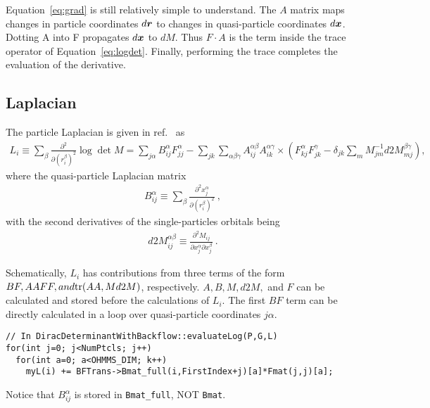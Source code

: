 Equation~\ref{eq:grad} is still relatively simple to understand. The $A$ matrix maps changes in particle coordinates $d\boldsymbol{r}$ to changes in quasi-particle coordinates $d\boldsymbol{x}$. Dotting A into F propagates $d\boldsymbol{x}$ to $dM$. Thus $F\cdot A$ is the term inside the trace operator of Equation~\ref{eq:logdet}. Finally, performing the trace completes the evaluation of the derivative.

\subsection{Laplacian}
The particle Laplacian is given in ref.~\cite{Kwon1993backflow} as
\begin{align}
L_i \equiv \sum\limits_{\beta} \frac{\partial^2}{\partial (r_i^\beta)^2} \log\det M = \sum\limits_{j\alpha} B_{ij}^\alpha F_{jj}^\alpha - \sum\limits_{jk}\sum\limits_{\alpha\beta\gamma} A_{ij}^{\alpha\beta}A_{ik}^{\alpha\gamma}\times\left(F_{kj}^\alpha F_{jk}^\gamma -\delta_{jk}\sum\limits_m M^{-1}_{jm} d2M_{mj}^{\beta\gamma}\right), \label{eq:lap}
\end{align}
where the quasi-particle Laplacian matrix
\begin{align}
B_{ij}^{\alpha} \equiv \sum\limits_\beta \frac{\partial^2 x_j^\alpha}{\partial (r_i^\beta)^2}\:,
\end{align}
with the second derivatives of the single-particles orbitals being
\begin{align}
d2M_{ij}^{\alpha\beta} \equiv \frac{\partial^2 M_{ij}}{\partial x_j^\alpha\partial x_j^\beta}\:.
\end{align}

Schematically, $L_i$ has contributions from three terms of the form $BF, AAFF, and \text{tr}(AA,Md2M)$, respectively. $A, B, M ,d2M,$ and $F$ can be calculated and stored before the calculations of $L_i$. The first $BF$ term can be directly calculated in a loop over quasi-particle coordinates $j\alpha$.
\begin{lstlisting}
// In DiracDeterminantWithBackflow::evaluateLog(P,G,L)
for(int j=0; j<NumPtcls; j++)
  for(int a=0; a<OHMMS_DIM; k++)
    myL(i) += BFTrans->Bmat_full(i,FirstIndex+j)[a]*Fmat(j,j)[a];
\end{lstlisting}
Notice that $B_{ij}^\alpha$ is stored in \verb|Bmat_full|, NOT \verb|Bmat|. 

